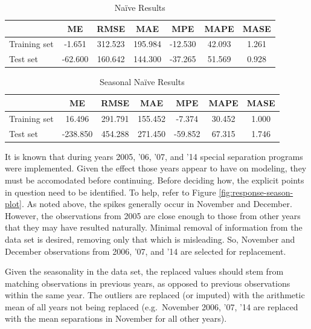 \documentclass[12pt,letterpaper,toc=flat,oneside]{report}
\theoremstyle{definition}
\theoremstyle{definition}
\theoremstyle{definition}
\theoremstyle{remark}
\begin{document}
\begin{table}[!h]

\caption{\label{tab:n-err}Na\"ive Results}
\centering
\begin{tabular}[t]{lcccccc}
\toprule
\bfseries{ } & \bfseries{ME} & \bfseries{RMSE} & \bfseries{MAE} & \bfseries{MPE} & \bfseries{MAPE} & \bfseries{MASE}\\
\midrule
Training set & -1.651 & 312.523 & 195.984 & -12.530 & 42.093 & 1.261\\
Test set & -62.600 & 160.642 & 144.300 & -37.265 & 51.569 & 0.928\\
\bottomrule
\end{tabular}
\end{table}\begin{table}[!h]

\caption{\label{tab:sn-err}Seasonal Na\"ive Results}
\centering
\begin{tabular}[t]{lcccccc}
\toprule
\bfseries{ } & \bfseries{ME} & \bfseries{RMSE} & \bfseries{MAE} & \bfseries{MPE} & \bfseries{MAPE} & \bfseries{MASE}\\
\midrule
Training set & 16.496 & 291.791 & 155.452 & -7.374 & 30.452 & 1.000\\
Test set & -238.850 & 454.288 & 271.450 & -59.852 & 67.315 & 1.746\\
\bottomrule
\end{tabular}
\end{table}

It is known that during years 2005, '06, '07, and '14 special separation
programs were implemented. Given the effect those years appear to have
on modeling, they must be accomodated before continuing. Before deciding
how, the explicit points in question need to be identified. To help,
refer to Figure \ref{fig:response-season-plot}. As noted above, the
spikes generally occur in November and December. However, the
observations from 2005 are close enough to those from other years that
they may have resulted naturally. Minimal removal of information from
the data set is desired, removing only that which is misleading. So,
November and December observations from 2006, '07, and '14 are selected
for replacement.

Given the seasonality in the data set, the replaced values should stem
from matching observations in previous years, as opposed to previous
observations within the same year. The outliers are replaced (or
imputed) with the arithmetic mean of all years not being replaced
(e.g.~November 2006, '07, '14 are replaced with the mean separations in
November for all other years).
\end{document}
